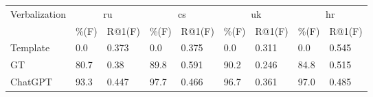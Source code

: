 \begin{tabular}{|l|ll|ll|ll|ll|}
\hline
 \multirow{2}{*}{Verbalization} & \multicolumn{2}{c|}{ru} & \multicolumn{2}{c|}{cs} & \multicolumn{2}{c|}{uk} & \multicolumn{2}{c|}{hr}  \\
                                & \%(F)                   & R@1(F)                  & \%(F)                   & R@1(F)                  & \%(F) & R@1(F) & \%(F) & R@1(F) \\
 Template                       & 0.0                     & 0.373                   & 0.0                     & 0.375                   & 0.0   & 0.311  & 0.0   & 0.545  \\
 GT                             & 80.7                    & 0.38                    & 89.8                    & 0.591                   & 90.2  & 0.246  & 84.8  & 0.515  \\
 ChatGPT                        & 93.3                    & 0.447                   & 97.7                    & 0.466                   & 96.7  & 0.361  & 97.0  & 0.485  \\
\hline
\end{tabular}